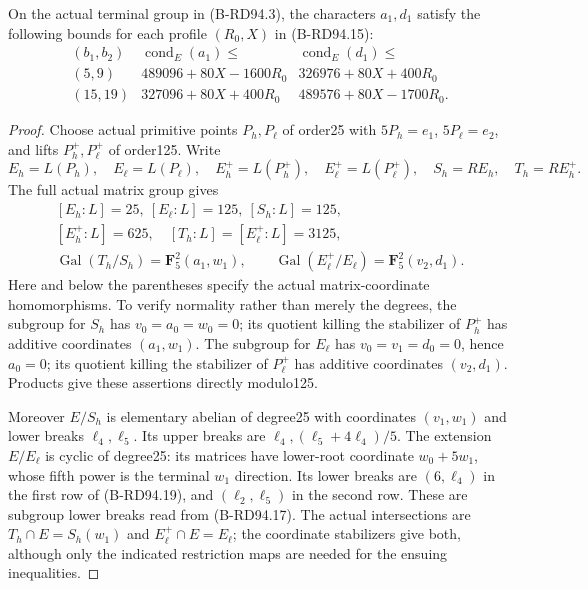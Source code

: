\begin{lemma}
\label{lem:B-RD94-terminal}
On the actual terminal group in (B-RD94.3), the characters
$a_1,d_1$ satisfy the following bounds for each profile
$(R_0,X)$ in (B-RD94.15):
\[
\begin{array}{c|r|r}
 (b_1,b_2)&\operatorname{cond}_E(a_1)\le&
                  \operatorname{cond}_E(d_1)\le\\\hline
 (5,9)&489096+80X-1600R_0&326976+80X+400R_0\\
 (15,19)&327096+80X+400R_0&489576+80X-1700R_0.
\end{array}                                           \tag{B-RD94.19}
\]
\end{lemma}
\begin{proof}
Choose actual primitive points $P_h,P_\ell$ of order25 with
$5P_h=e_1$, $5P_\ell=e_2$, and lifts $P_h^+,P_\ell^+$ of order125.
Write
\[
 E_h=L(P_h),\quad E_\ell=L(P_\ell),\quad
 E_h^+=L(P_h^+),\quad E_\ell^+=L(P_\ell^+),\quad
 S_h=RE_h,\quad T_h=RE_h^+.
\]
The full actual matrix group gives
\[
\begin{gathered}
 [E_h:L]=25,\ [E_\ell:L]=125,\ [S_h:L]=125,\\
 [E_h^+:L]=625,\quad[T_h:L]=[E_\ell^+:L]=3125,\\
 \operatorname{Gal}(T_h/S_h)=\mathbf F_5^2(a_1,w_1),\qquad
 \operatorname{Gal}(E_\ell^+/E_\ell)=\mathbf F_5^2(v_2,d_1).
\end{gathered}                                        \tag{B-RD94.20}
\]
Here and below the parentheses specify the actual matrix-coordinate
homomorphisms. To verify normality rather than merely the degrees,
the subgroup for $S_h$ has $v_0=a_0=w_0=0$; its quotient killing
the stabilizer of $P_h^+$ has additive coordinates $(a_1,w_1)$.
The subgroup for $E_\ell$ has $v_0=v_1=d_0=0$, hence $a_0=0$;
its quotient killing the stabilizer of $P_\ell^+$ has additive
coordinates $(v_2,d_1)$. Products give these assertions directly
modulo125.

Moreover $E/S_h$ is elementary abelian of degree25 with coordinates
$(v_1,w_1)$ and lower breaks $\ell_4,\ell_5$. Its upper breaks
are $\ell_4,(\ell_5+4\ell_4)/5$. The extension $E/E_\ell$ is
cyclic of degree25: its matrices have lower-root coordinate
$w_0+5w_1$, whose fifth power is the terminal $w_1$ direction.
Its lower breaks are $(6,\ell_4)$ in the first row of
(B-RD94.19), and $(\ell_2,\ell_5)$ in the second row.
These are subgroup lower breaks read from (B-RD94.17).
The actual intersections are
$T_h\cap E=S_h(w_1)$ and $E_\ell^+\cap E=E_\ell$;
the coordinate stabilizers give both, although only the indicated
restriction maps are needed for the ensuing inequalities.


\end{proof}

